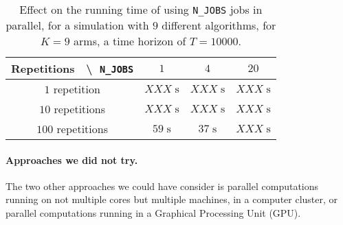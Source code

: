

\begin{table}[ht]
    \centering
    \begin{tabular}{c|ccc}
    \textbf{Repetitions} $\;$ \textbackslash $\;$ \texttt{N\_JOBS} & $1$ & $4$ & $20$ \\
        \hline
        $1$ repetition    & $XXX \;\text{s}$ & $XXX \;\text{s}$ & $XXX \;\text{s}$ \\
        $10$ repetitions  & $XXX \;\text{s}$ & $XXX \;\text{s}$ & $XXX \;\text{s}$ \\
        $100$ repetitions & $59 \;\text{s}$ & $37 \;\text{s}$ & $XXX \;\text{s}$ \\
        \hline
    \end{tabular}
    \caption{Effect on the running time of using \texttt{N\_JOBS} jobs in parallel, for a simulation with $9$ different algorithms, for $K=9$ arms, a time horizon of $T=10000$.}
    \label{table:3:speedUpTimeParallelComputations}
\end{table}

\paragraph{Approaches we did not try.}
%
The two other approaches we could have consider is parallel computations running on not multiple cores but multiple machines, in a computer cluster, or parallel computations running in a Graphical Processing Unit (GPU).

